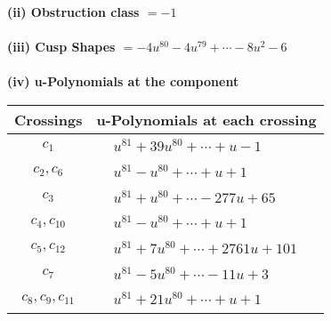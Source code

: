 \documentclass[1p]{elsarticle_modified}
\theoremstyle{definition}
\begin{document}
\flushleft \textbf{(ii) Obstruction class $= -1$}\\~\\
\flushleft \textbf{(iii) Cusp Shapes $= -4 u^{80}-4 u^{79}+\cdots-8 u^2-6$}\\~\\
\newpage\renewcommand{\arraystretch}{1}
\flushleft \textbf{(iv) u-Polynomials at the component}\newline \\
\begin{tabular}{m{50pt}|m{274pt}}
Crossings & \hspace{64pt}u-Polynomials at each crossing \\
\hline $$\begin{aligned}c_{1}\end{aligned}$$&$\begin{aligned}
&u^{81}+39 u^{80}+\cdots+u-1
\end{aligned}$\\
\hline $$\begin{aligned}c_{2},c_{6}\end{aligned}$$&$\begin{aligned}
&u^{81}- u^{80}+\cdots+u+1
\end{aligned}$\\
\hline $$\begin{aligned}c_{3}\end{aligned}$$&$\begin{aligned}
&u^{81}+u^{80}+\cdots-277 u+65
\end{aligned}$\\
\hline $$\begin{aligned}c_{4},c_{10}\end{aligned}$$&$\begin{aligned}
&u^{81}- u^{80}+\cdots+u+1
\end{aligned}$\\
\hline $$\begin{aligned}c_{5},c_{12}\end{aligned}$$&$\begin{aligned}
&u^{81}+7 u^{80}+\cdots+2761 u+101
\end{aligned}$\\
\hline $$\begin{aligned}c_{7}\end{aligned}$$&$\begin{aligned}
&u^{81}-5 u^{80}+\cdots-11 u+3
\end{aligned}$\\
\hline $$\begin{aligned}c_{8},c_{9},c_{11}\end{aligned}$$&$\begin{aligned}
&u^{81}+21 u^{80}+\cdots+u+1
\end{aligned}$\\
\hline
\end{tabular}\\~\\
\end{document}

